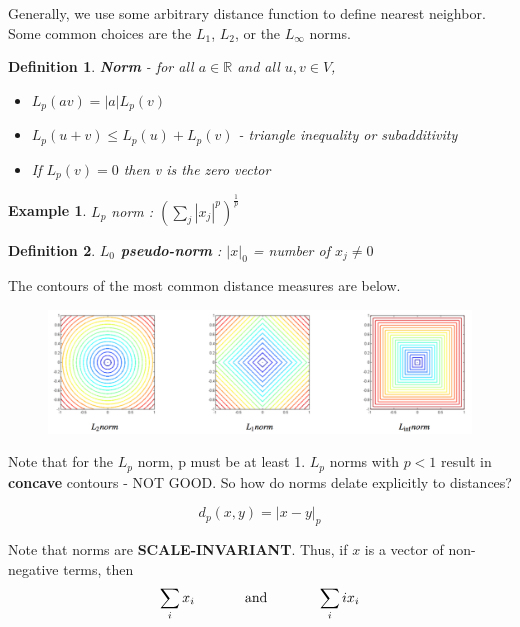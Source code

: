 \documentclass[a4paper]{article}\usepackage[]{graphicx}\usepackage[]{color}
\newtheorem{defn}{Definition}[section]
\newtheorem{ex}{Example}[section]
\begin{document}
Generally, we use some arbitrary distance function to define nearest neighbor. Some common choices are the $L_1$, $L_2$, or the $L_{\infty}$ norms. 

\begin{defn}
\textbf{Norm} - for all $a \in \mathbb{R}$ and all $u,v \in V$,
\begin{itemize}
\item $L_p(av) = |a|L_p(v)$
\item $L_p(u+v) \leq L_p(u) + L_p(v)$ - \emph{triangle inequality or subadditivity}
\item If $L_p(v)=0$ then v is the zero vector
\end{itemize}
\end{defn}

\begin{ex}
$L_p$ norm : $\left(\sum_{j}|x_j|^p\right)^{\frac{1}{p}}$
\end{ex}

\begin{defn}
\textbf{$L_0$ pseudo-norm} : $|x|_0$ = number of $x_j \neq 0$ 
\end{defn}

The contours of the most common distance measures are below.

\begin{figure}[H]
\centering
\includegraphics[width=6in]{norm_contour.png}
\end{figure}

Note that for the $L_p$ norm, p must be at least 1. $L_p$ norms with $p<1$ result in \textbf{concave} contours - NOT GOOD. So how do norms delate explicitly to distances?

\begin{equation*}
d_p(x,y) = |x-y|_p
\end{equation*}

Note that norms are \textbf{SCALE-INVARIANT}. Thus, if $x$ is a vector of non-negative terms, then 
\begin{align*}
\sum_i x_i \hspace{0.5in} \text{and} \hspace{0.5in} \sum_i ix_i
\end{align*}
\end{document}
